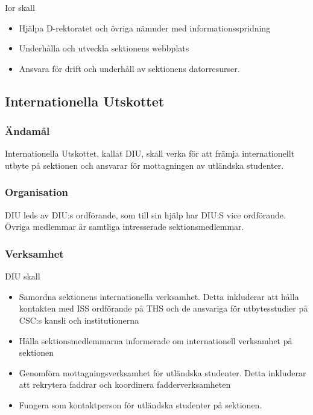 \documentclass{dgovdoc}
\begin{document}
Ior skall

\begin{itemize}
  \item Hjälpa D-rektoratet och övriga nämnder med informationsspridning
  \item Underhålla och utveckla sektionens webbplats
  \item Ansvara för drift och underhåll av sektionens datorresurser.
\end{itemize}

\subsection{Internationella Utskottet}

\subsubsection{Ändamål}

Internationella Utskottet, kallat DIU, skall verka för att främja internationellt utbyte på sektionen och ansvarar för mottagningen av utländska studenter.

\subsubsection{Organisation}

DIU leds av DIU:s ordförande, som till sin hjälp har DIU:S vice ordförande. Övriga medlemmar är samtliga intresserade sektionsmedlemmar.

\subsubsection{Verksamhet}

DIU skall

\begin{itemize}
  \item Samordna sektionens internationella verksamhet. Detta inkluderar att hålla kontakten med ISS ordförande på THS och de ansvariga för utbytesstudier på CSC:s kansli och institutionerna
  \item Hålla sektionsmedlemmarna informerade om internationell verksamhet på sektionen
  \item Genomföra mottagningsverksamhet för utländska studenter. Detta inkluderar att rekrytera faddrar och koordinera fadderverksamheten
  \item Fungera som kontaktperson för utländska studenter på sektionen.
\end{itemize}
\end{document}
